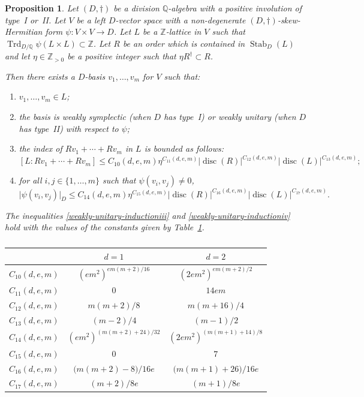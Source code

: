 \documentclass[11pt]{article}
\numberwithin{equation}{section}
\newenvironment{enumeratei}
{\bgroup\def\theenumi{\roman{enumi}}\def\theenumii{\alph{enumii}}\begin{enumerate}}
{\end{enumerate}\egroup}
\newcommand{\bQ}{\mathbb{Q}}
\newcommand{\bZ}{\mathbb{Z}}
\DeclareMathOperator{\disc}{disc}
\DeclareMathOperator{\Stab}{Stab}
\DeclareMathOperator{\Trd}{Trd}
\newcommand{\abs}[1]{\lvert #1 \rvert}
\newtheorem{proposition}[lemma]{Proposition}
\begin{document}
\begin{proposition} \label{weakly-unitary-induction}
Let $(D,\dag)$ be a division $\bQ$-algebra with a positive involution of type~I or~II.
Let $V$ be a left $D$-vector space with a non-degenerate $(D,\dag)$-skew-Hermitian form $\psi \colon V \!\times\! V \!\to\! D$.
Let $L$ be a $\bZ$-lattice in $V$ such that \hbox{$\Trd_{D/\bQ} \psi(L \!\times\! L) \!\subset\! \bZ$}.
Let $R$ be an order which is contained in $\Stab_D(L)$ and let $\eta \in \bZ_{>0}$ be a positive integer such that $\eta R^\dag \subset R$.

Then there exists a $D$-basis $v_1, \dotsc, v_m$ for $V$ such that:
\begin{enumeratei}
\item\label{weakly-unitary-inductioni} $v_1, \dotsc, v_m \in L$;
\item\label{weakly-unitary-inductionii} the basis is weakly symplectic (when $D$ has type~I) or weakly unitary (when $D$ has type~II) with respect to $\psi$;
\item\label{weakly-unitary-inductioniii} the index of $Rv_1 + \dotsb + Rv_m$ in $L$ is bounded as follows:
\[
[L : Rv_1 + \dotsb + Rv_m] \leq C_{10}(d,e,m) \eta^{C_{11}(d,e,m)} \abs{\disc(R)}^{C_{12}(d,e,m)} \abs{\disc(L)}^{C_{13}(d,e,m)};
\]
\item\label{weakly-unitary-inductioniv} for all $i, j \in \{ 1, \dotsc, m \}$ such that $\psi(v_i, v_j) \neq 0$,
\[
\abs{\psi(v_i, v_j)}_D \leq C_{14}(d, e, m) \eta^{C_{15}(d,e,m)} \abs{\disc(R)}^{C_{16}(d,e,m)} \abs{\disc(L)}^{C_{17}(d,e,m)}.
\]
\end{enumeratei}

The inequalities \eqref{weakly-unitary-inductioniii} and \eqref{weakly-unitary-inductioniv} hold with the values of the constants given by Table~\ref{Table:1}.
\begin{table}
\caption{\label{Table:1}}
\begin{center}
\bgroup
\renewcommand{\arraystretch}{1.4}
\begin{tabular}{|c|c|c|}
\hline
& $d=1$
& $d=2$
\\ \hline
$C_{10}(d,e,m)$
& $(em^2)^{em(m+2)/16}$
& $(2em^2)^{em(m+2)/2}$
\\ $C_{11}(d,e,m)$
& $0$
& $14em$
\\ $C_{12}(d,e,m)$
& $m(m+2)/8$
& $m(m+16)/4$
\\ $C_{13}(d,e,m)$
& $(m-2)/4$
& $(m-1)/2$
\\ $C_{14}(d,e,m)$
& $(em^2)^{(m(m+2)+24)/32}$
& $(2em^2)^{(m(m+1)+14)/8}$
\\ $C_{15}(d,e,m)$
& $0$
& $7$
\\ $C_{16}(d,e,m)$
& $\bigl( m(m+2)-8 \bigr)/16e$
& $\bigl( m(m+1)+26 \bigr)/16e$
\\ $C_{17}(d,e,m)$
& $(m+2)/8e$
& $(m+1)/8e$\\
\hline
\end{tabular}
\egroup
\end{center}
\vspace*{-\baselineskip}
\end{table}
\end{proposition}
\end{document}
